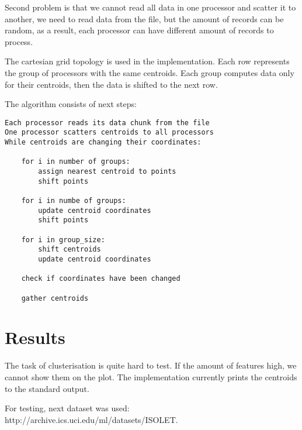 \documentclass[11pt, a4paper]{scrartcl}
\begin{document}
Second problem is that we cannot read all data in one processor and scatter it to another, we need to read data from the file, but the amount of records can be random, as a result, each processor can have different amount of records to process.

The cartesian grid topology is used in the implementation. Each row represents the group of processors with the same centroids. Each group computes data only for their centroids, then the data is shifted to the next row. 

The algorithm consists of next steps:

\begin{lstlisting}
Each processor reads its data chunk from the file
One processor scatters centroids to all processors
While centroids are changing their coordinates:
	
	for i in number of groups:
		assign nearest centroid to points
		shift points

	for i in numbe of groups:
		update centroid coordinates
		shift points

	for i in group_size:
		shift centroids
		update centroid coordinates

	check if coordinates have been changed

	gather centroids 

\end{lstlisting}


\section{Results}

The task of clusterisation is quite hard to test. If the amount of features high, we cannot show them on the plot. The implementation currently prints the centroids to the standard output. 

For testing, next dataset was used: http://archive.ics.uci.edu/ml/datasets/ISOLET.
\end{document}
